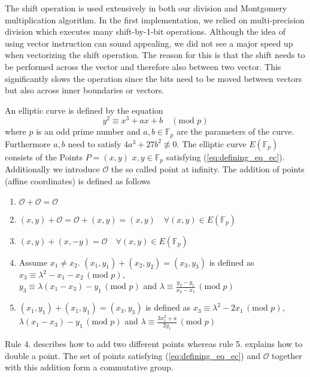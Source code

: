 
The shift operation is used extensively in both our division and Montgomery multiplication algorithm. In the first implementation, we relied on multi-precision division which executes many shift-by-1-bit operations. Although the idea of using vector instruction can sound appealing, we did not see a major speed up when vectorizing the shift operation. The reason for this is that the shift needs to be performed across the vector and therefore also between two vector. This significantly slows the operation since the bits need to be moved between vectors but also across inner boundaries or vectors.

An elliptic curve is defined by the equation
\begin{equation}\label{eq:defining_eq_ec}
y^2 \equiv x^3 + ax + b \quad (\text{mod } p)
\end{equation}
where $p$ is an odd prime number and $a,b \in \mathbb{F}_p$ are the parameters of the curve. Furthermore $a, b$ need to satisfy $4a^3 + 27b^2 \not\equiv 0$. The elliptic curve $E\left(\mathbb{F}_p\right)$ consists of the Points $P=(x,y)$ $x,y \in \mathbb{F}_p$ satisfying (\ref{eq:defining_eq_ec}). Additionally we introduce $\mathcal{O}$ the so called point at infinity. The addition of points (affine coordinates) is defined as follows \cite{Brown:2009}
\begin{enumerate}
\item{$\mathcal{O} + \mathcal{O} = \mathcal{O}$}
\item{$(x,y) + \mathcal{O} = \mathcal{O} + (x,y) = (x,y) \quad \forall (x,y) \in E(\mathbb{F}_p)$}
\item{$(x,y) + (x,-y) = \mathcal{O} \quad \forall (x,y) \in E(\mathbb{F}_p)$}
\item{Assume  $x_1 \neq x_2$. $(x_1, y_1) + (x_2, y_2) = (x_3, y_3)$ is defined as $x_3 \equiv \lambda^2 - x_1 - x_2 \, (\text{mod } p),$ \\ $y_3 \equiv \lambda(x_1 - x_3) - y_1 \, (\text{mod } p)$ and $\lambda \equiv \frac{y_2 - y_1}{x_2 - x_1} \, (\text{mod } p)$}
\item{$(x_1, y_1) + (x_1, y_1) = (x_3, y_3)$ is defined as $x_3 \equiv \lambda^2 -2 x_1 \, (\text{mod } p)$, $\lambda (x_1 - x_3) - y_1  \, (\text{mod } p)$ and $\lambda \equiv \frac{3 x_1^2 + a}{2y_1} \, (\text{mod } p)$}
\end{enumerate}
Rule 4. describes how to add two different points whereas rule 5. explains how to double a point. The set of points satisfying (\ref{eq:defining_eq_ec}) and $\mathcal{O}$ together with this addition form a commutative group.

